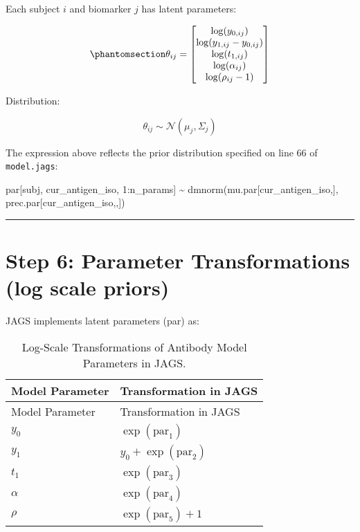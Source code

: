 \documentclass[
]{article}
\newenvironment{Shaded}{\begin{snugshade}}{\end{snugshade}}
\newcommand{\DecValTok}[1]{\textcolor[rgb]{0.68,0.00,0.00}{#1}}
\newcommand{\FunctionTok}[1]{\textcolor[rgb]{0.28,0.35,0.67}{#1}}
\newcommand{\NormalTok}[1]{\textcolor[rgb]{0.00,0.23,0.31}{#1}}
\newcommand{\SpecialCharTok}[1]{\textcolor[rgb]{0.37,0.37,0.37}{#1}}
\begin{document}
Each subject \(i\) and biomarker \(j\) has latent parameters:

\begin{equation}\phantomsection\label{eq-10}{
\theta_{ij} =
\begin{bmatrix}
\log(y_{0,ij}) \\
\log(y_{1,ij} - y_{0,ij}) \\
\log(t_{1,ij}) \\
\log(\alpha_{ij}) \\
\log(\rho_{ij} - 1)
\end{bmatrix}
}\end{equation}

Distribution:

\[
\theta_{ij} \sim \mathcal{N}(\mu_j, \Sigma_j)
\]

The expression above reflects the prior distribution specified on line
66 of \texttt{model.jags}:

\begin{Shaded}
\begin{Highlighting}[numbers=left,,firstnumber=66,]
\NormalTok{   par[subj, cur\_antigen\_iso, }\DecValTok{1}\SpecialCharTok{:}\NormalTok{n\_params] }\SpecialCharTok{\textasciitilde{}} \FunctionTok{dmnorm}\NormalTok{(mu.par[cur\_antigen\_iso,], prec.par[cur\_antigen\_iso,,])}
\end{Highlighting}
\end{Shaded}

\begin{center}\rule{0.5\linewidth}{0.5pt}\end{center}

\section{Step 6: Parameter Transformations (log scale
priors)}\label{step-6-parameter-transformations-log-scale-priors}

JAGS implements latent parameters (par) as:

\begin{longtable}[]{@{}ll@{}}
\caption{Log-Scale Transformations of Antibody Model Parameters in
JAGS.}\label{tbl-transformation}\tabularnewline
\toprule\noalign{}
Model Parameter & Transformation in JAGS \\
\midrule\noalign{}
\endfirsthead
\toprule\noalign{}
Model Parameter & Transformation in JAGS \\
\midrule\noalign{}
\endhead
\bottomrule\noalign{}
\endlastfoot
\(y_0\) & \(\exp(\text{par}_1)\) \\
\(y_1\) & \(y_0 + \exp(\text{par}_2)\) \\
\(t_1\) & \(\exp(\text{par}_3)\) \\
\(\alpha\) & \(\exp(\text{par}_4)\) \\
\(\rho\) & \(\exp(\text{par}_5) + 1\) \\
\end{longtable}
\end{document}
